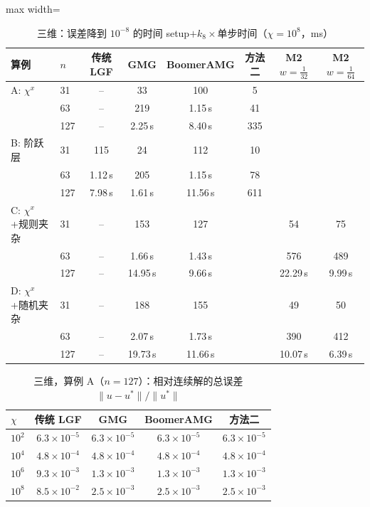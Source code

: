 \begin{table}[H]\centering\small
\caption{三维：误差降到 $10^{-8}$ 的时间 setup$+k_8\times$单步时间（$\chi=10^8$，ms）}\label{tab:t83d}
\begin{adjustbox}{max width=\textwidth}
\begin{tabular}{llcccccc}
\toprule
算例 & $n$ & 传统 LGF & GMG & BoomerAMG & 方法二 & M2 $w{=}\frac1{32}$ & M2 $w{=}\frac1{64}$ \\
\midrule
A: $\chi^x$ & 31 & -- & 33 & 100 & 5 &  &  \\
 & 63 & -- & 219 & 1.15\,s & 41 &  &  \\
 & 127 & -- & 2.25\,s & 8.40\,s & 335 &  &  \\
\midrule
B: 阶跃层 & 31 & 115 & 24 & 112 & 10 &  &  \\
 & 63 & 1.12\,s & 205 & 1.15\,s & 78 &  &  \\
 & 127 & 7.98\,s & 1.61\,s & 11.56\,s & 611 &  &  \\
\midrule
C: $\chi^x$+规则夹杂 & 31 & -- & 153 & 127 &  & 54 & 75 \\
 & 63 & -- & 1.66\,s & 1.43\,s &  & 576 & 489 \\
 & 127 & -- & 14.95\,s & 9.66\,s &  & 22.29\,s & 9.99\,s \\
\midrule
D: $\chi^x$+随机夹杂 & 31 & -- & 188 & 155 &  & 49 & 50 \\
 & 63 & -- & 2.07\,s & 1.73\,s &  & 390 & 412 \\
 & 127 & -- & 19.73\,s & 11.66\,s &  & 10.07\,s & 6.39\,s \\
\bottomrule
\end{tabular}
\end{adjustbox}
\end{table}

\begin{table}[H]\centering\small
\caption{三维，算例 A（$n=127$）：相对连续解的总误差 $\|u-u^*\|/\|u^*\|$}\label{tab:aerr三维}
\begin{tabular}{lcccc}
\toprule
$\chi$ & 传统 LGF & GMG & BoomerAMG & 方法二 \\
\midrule
$10^{2}$ & $6.3{\times}10^{-5}$ & $6.3{\times}10^{-5}$ & $6.3{\times}10^{-5}$ & $6.3{\times}10^{-5}$ \\
$10^{4}$ & $4.8{\times}10^{-4}$ & $4.8{\times}10^{-4}$ & $4.8{\times}10^{-4}$ & $4.8{\times}10^{-4}$ \\
$10^{6}$ & $9.3{\times}10^{-3}$ & $1.3{\times}10^{-3}$ & $1.3{\times}10^{-3}$ & $1.3{\times}10^{-3}$ \\
$10^{8}$ & $8.5{\times}10^{-2}$ & $2.5{\times}10^{-3}$ & $2.5{\times}10^{-3}$ & $2.5{\times}10^{-3}$ \\
\bottomrule
\end{tabular}
\end{table}